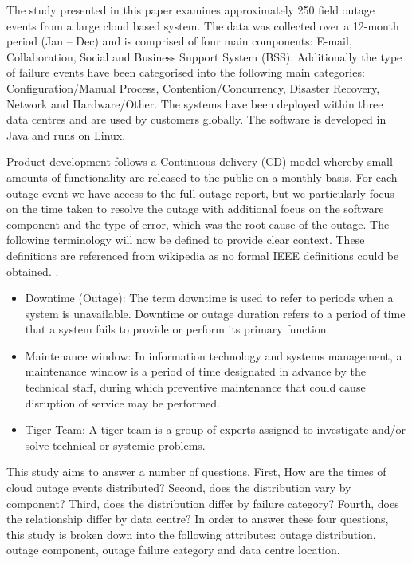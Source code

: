 The study presented in this paper examines approximately 250 field outage events from a large cloud based system. The data was collected over a 12-month period (Jan -- Dec) and is comprised of four main components: E-mail, Collaboration, Social and Business Support System (BSS). Additionally the type of failure events have been categorised into the following main categories: Configuration/Manual Process, Contention/Concurrency, Disaster Recovery, Network and Hardware/Other. The systems have been deployed within three data centres and are used by customers globally. The software is developed in Java and runs on Linux. \par 

Product development follows a Continuous delivery (CD) model whereby small amounts of functionality are released to the public on a monthly basis. For each outage event we have access to the full outage report, but we particularly focus on the time taken to resolve the outage with additional focus on the software component and the type of error, which was the root cause of the outage. The following terminology will now be defined to provide clear context. These definitions are referenced from wikipedia as no formal IEEE definitions could be obtained. \cite{wikidef}. \par


\begin{itemize}
 \item Downtime (Outage): The term downtime is used to refer to periods when a system is unavailable. Downtime or outage duration refers to a period of time that a system fails to provide or perform its primary function. 
 \item  Maintenance window: In information technology and systems management, a maintenance window is a period of time designated in advance by the technical staff, during which preventive maintenance that could cause disruption of service may be performed.
 \item Tiger Team: A tiger team is a group of experts assigned to investigate and/or solve technical or systemic problems. 
\end{itemize}

This study aims to answer a number of questions. First, How are the times of cloud outage events distributed? Second, does the distribution vary by component? Third, does the distribution differ by failure category? Fourth, does the relationship differ by data centre? In order to answer these four questions, this study is broken down into the following attributes: outage distribution, outage component, outage failure category and  data centre location. \par


